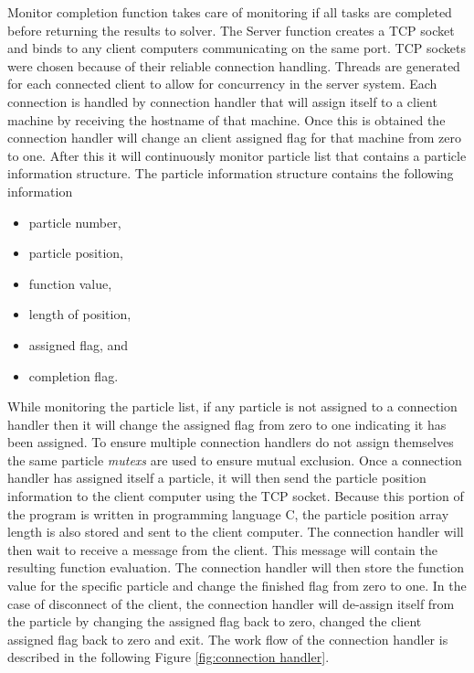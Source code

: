 Monitor completion function takes care of monitoring if all tasks are completed before returning the results to solver. The Server function creates a TCP socket and binds to any client computers communicating on the same port. TCP sockets were chosen because of their reliable connection handling. Threads are generated for each connected client to allow for concurrency in the server system. Each connection is handled by connection handler that will assign itself to a client
machine by receiving the hostname of that machine. Once this is obtained the connection handler will change an client assigned flag for that machine from zero to one. After this it will continuously monitor particle list that contains a particle information structure. The particle information
structure contains the following information 
\begin{itemize}
    \item particle number,
    \item particle position,
    \item function value,
    \item length of position, 
    \item assigned flag, and
    \item completion flag.
\end{itemize}
While monitoring the particle list, if any particle is not assigned to a connection handler then it will change the assigned flag from zero to one indicating it has been assigned. To ensure multiple connection handlers do not assign themselves the same particle \textit{mutexs} are used to ensure mutual exclusion. Once a connection handler has assigned itself a particle, it will then send the particle position information to the client computer using the TCP socket. Because this portion
of the program is written in programming language C, the particle position array length is also stored and sent to the client computer. The connection handler will then wait to receive a message from the client. This message will contain the resulting function evaluation. The connection handler will then store the function value for the specific particle and change the finished flag from zero to one. In the case of disconnect of the client, the connection handler will de-assign itself from
the particle by changing the assigned flag back to zero, changed the client assigned flag back to zero and exit. The work flow of the connection handler is described in the following Figure \ref{fig:connection handler}.

